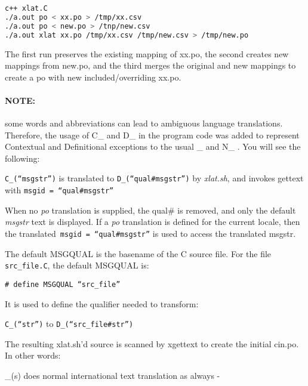 \begin{lstlisting}[language=bash,numbers=none]
c++ xlat.C
./a.out po < xx.po > /tmp/xx.csv
./a.out po < new.po > /tnp/new.csv
./a.out xlat xx.po /tmp/xx.csv /tmp/new.csv > /tmp/new.po
\end{lstlisting}

The first run preserves the existing mapping of xx.po, the second creates new mappings from new.po, and the third merges the original and new mappings to create a po with new included/overriding xx.po.

\paragraph{NOTE:} some words and abbreviations can lead to ambiguous language translations.  Therefore, the usage of C\_ and D\_ in the program code was added to represent Contextual and Definitional exceptions to the usual \_ and N\_ .  You will see the following:

\vspace{2ex} \texttt{C\_(“msgstr”)}  is translated to \texttt{D\_(“qual\#msgstr”)} by \textit{xlat.sh}, and invokes gettext with \texttt{msgid = “qual\#msgstr”}

\vspace{2ex} When no \textit{po} translation is supplied, the qual\# is removed, and only the default \textit{msgstr} text is displayed.   If a \textit{po} translation is defined for the current locale, then the translated\texttt{ msgid = “qual\#msgstr”} is used to access the translated msgstr.

\vspace{2ex} \noindent The default MSGQUAL is the basename of the C source file.  For the file \texttt{src\_file.C}, the default MSGQUAL is:

\vspace{2ex} \texttt{\# define MSGQUAL “src\_file”}

\vspace{2ex} \noindent It is used to define the qualifier needed to transform:

\vspace{2ex} \texttt{C\_(“str”)} to \texttt{D\_(“src\_file\#str”)}

\vspace{2ex} \noindent The resulting xlat.sh'd source is scanned by xgettext to create the initial cin.po.  In other words:

\vspace{2ex} \_(s) does normal international text translation as always -

